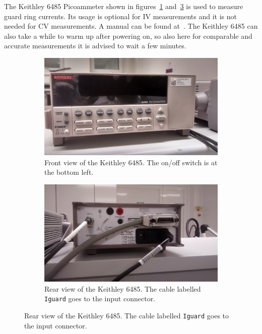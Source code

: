 \documentclass[a4paper]{article}
\begin{document}
The Keithley 6485 Picoammeter shown in figures~\ref{fig:keithley6485front} and~\ref{fig:keithley6485rear} is used to measure guard ring currents.
Its usage is optional for IV measurements and it is not needed for CV measurements.
A manual can be found at~\cite{ref:keithley6485ref}.
The Keithley 6485 can also take a while to warm up after powering on, so also here for comparable and accurate measurements it is advised to wait a few minutes.\\

\begin{figure}[hbtp]
\centering
\begin{subfigure}[t]{0.475\textwidth}
\centering\captionsetup{width=.8\linewidth}%
\includegraphics[width=\linewidth]{pictures/front_keithley64.jpg}
\caption[Front View of the Keithley 6485]{Front view of the Keithley 6485. The on/off switch is at the bottom left.}
\label{fig:keithley6485front}
\end{subfigure}
\begin{subfigure}[t]{0.475\textwidth}
\centering\captionsetup{width=.8\linewidth}%
\includegraphics[width=\linewidth]{pictures/back_keithley64.jpg}
\caption[Back View of the Keithley 6485]{Rear view of the Keithley 6485. The cable labelled {\tt Iguard} goes to the input connector.}
\label{fig:keithley6485rear}
\end{subfigure}
\end{figure}
\end{document}

